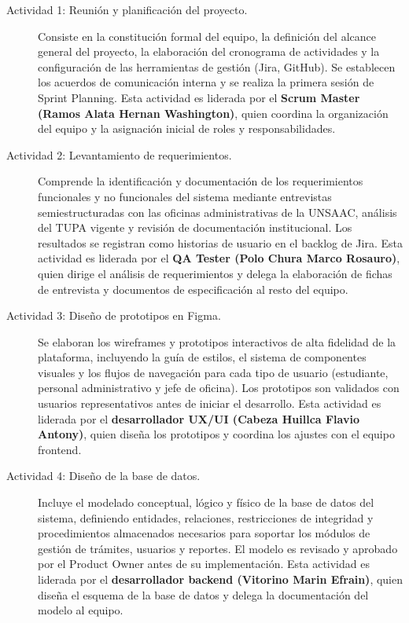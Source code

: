 \begin{description}

    \item[Actividad 1: Reunión y planificación del proyecto.]
    Consiste en la constitución formal del equipo, la definición del alcance general del
    proyecto, la elaboración del cronograma de actividades y la configuración de las
    herramientas de gestión (Jira, GitHub). Se establecen los acuerdos de comunicación
    interna y se realiza la primera sesión de Sprint Planning. Esta actividad es liderada
    por el \textbf{Scrum Master (Ramos Alata Hernan Washington)}, quien coordina la
    organización del equipo y la asignación inicial de roles y responsabilidades.

    \item[Actividad 2: Levantamiento de requerimientos.]
    Comprende la identificación y documentación de los requerimientos funcionales y no
    funcionales del sistema mediante entrevistas semiestructuradas con las oficinas
    administrativas de la UNSAAC, análisis del TUPA vigente y revisión de documentación
    institucional. Los resultados se registran como historias de usuario en el backlog de
    Jira. Esta actividad es liderada por el \textbf{QA Tester (Polo Chura Marco Rosauro)},
    quien dirige el análisis de requerimientos y delega la elaboración de fichas de
    entrevista y documentos de especificación al resto del equipo.

    \item[Actividad 3: Diseño de prototipos en Figma.]
    Se elaboran los wireframes y prototipos interactivos de alta fidelidad de la plataforma,
    incluyendo la guía de estilos, el sistema de componentes visuales y los flujos de
    navegación para cada tipo de usuario (estudiante, personal administrativo y jefe de
    oficina). Los prototipos son validados con usuarios representativos antes de iniciar el
    desarrollo. Esta actividad es liderada por el \textbf{desarrollador UX/UI (Cabeza
    Huillca Flavio Antony)}, quien diseña los prototipos y coordina los ajustes con el
    equipo frontend.

    \item[Actividad 4: Diseño de la base de datos.]
    Incluye el modelado conceptual, lógico y físico de la base de datos del sistema,
    definiendo entidades, relaciones, restricciones de integridad y procedimientos
    almacenados necesarios para soportar los módulos de gestión de trámites, usuarios y
    reportes. El modelo es revisado y aprobado por el Product Owner antes de su
    implementación. Esta actividad es liderada por el \textbf{desarrollador backend
    (Vitorino Marin Efrain)}, quien diseña el esquema de la base de datos y delega la
    documentación del modelo al equipo.


\end{description}
